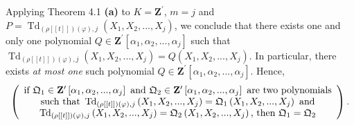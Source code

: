 \documentclass[numbers=enddot,12pt,final,onecolumn,notitlepage]{scrartcl}%
\begin{document}
Applying Theorem 4.1 \textbf{(a)} to $K=\mathbf{Z}^{\prime}$, $m=j$ and
$P=\operatorname*{Td}\nolimits_{\left(  \rho\left[  \left[  t\right]  \right]
\right)  \left(  \varphi\right)  ,j}\left(  X_{1},X_{2},...,X_{j}\right)  $,
we conclude that there exists one and only one polynomial $Q\in\mathbf{Z}%
^{\prime}\left[  \alpha_{1},\alpha_{2},...,\alpha_{j}\right]  $ such that
$\operatorname*{Td}\nolimits_{\left(  \rho\left[  \left[  t\right]  \right]
\right)  \left(  \varphi\right)  ,j}\left(  X_{1},X_{2},...,X_{j}\right)
=Q\left(  X_{1},X_{2},...,X_{j}\right)  $. In particular, there exists
\textit{at most one} such polynomial $Q\in\mathbf{Z}^{\prime}\left[
\alpha_{1},\alpha_{2},...,\alpha_{j}\right]  $. Hence,
\begin{equation}
\left(
\begin{array}
[c]{c}%
\text{if }\mathfrak{Q}_{1}\in\mathbf{Z}^{\prime}\left[  \alpha_{1},\alpha
_{2},...,\alpha_{j}\right]  \text{ and }\mathfrak{Q}_{2}\in\mathbf{Z}^{\prime
}\left[  \alpha_{1},\alpha_{2},...,\alpha_{j}\right]  \text{ are two
polynomials}\\
\text{such that }\operatorname*{Td}\nolimits_{\left(  \rho\left[  \left[
t\right]  \right]  \right)  \left(  \varphi\right)  ,j}\left(  X_{1}%
,X_{2},...,X_{j}\right)  =\mathfrak{Q}_{1}\left(  X_{1},X_{2},...,X_{j}%
\right)  \text{ and}\\
\operatorname*{Td}\nolimits_{\left(  \rho\left[  \left[  t\right]  \right]
\right)  \left(  \varphi\right)  ,j}\left(  X_{1},X_{2},...,X_{j}\right)
=\mathfrak{Q}_{2}\left(  X_{1},X_{2},...,X_{j}\right)  \text{, then
}\mathfrak{Q}_{1}=\mathfrak{Q}_{2}%
\end{array}
\right)  . \label{10.21.pf.1}%
\end{equation}
\end{document}
